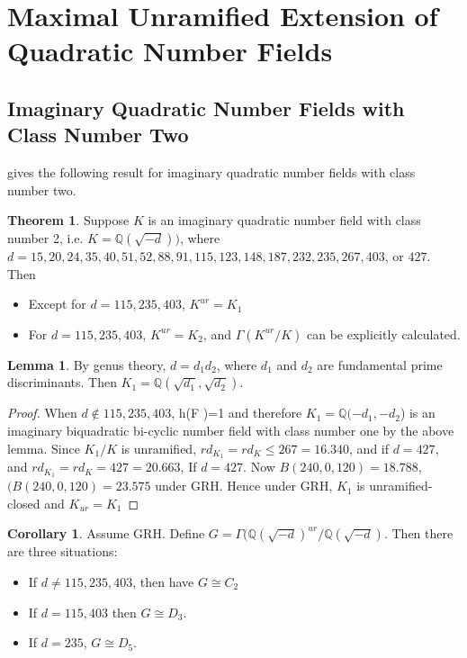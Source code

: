 \documentclass[12pt]{extarticle}
\newcommand{\Q}{\mathbb{Q}}
\newcommand{\<}{\langle}
\renewcommand{\>}{\rangle}
\theoremstyle{definition}
\newtheorem{theorem}{Theorem}
\newtheorem{corollary}{Corollary}
\newtheorem{lemma}{Lemma}
\begin{document}
\section{Maximal Unramified Extension of Quadratic Number Fields}
\subsection{Imaginary Quadratic Number Fields with Class Number Two}
\cite{YAMAMURA1996} gives the following result for imaginary quadratic number fields with class number two.
\begin{theorem}
Suppose $K$ is an imaginary quadratic number field with class number 2, i.e. $K=\Q(\sqrt{-d}))$, where $d= 15, 20, 24, 35, 40, 51, 52, 88, 91, 115, 123, 148, 187, 232, 235, 267, 403$, or $427$. Then \begin{itemize}
\item Except for $d = 115, 235, 403$, $K^{ur} = K_1$
\item For $d = 115, 235, 403$,  $K^{ur} = K_2$, and $\Gamma(K^{ur}/K)$ can be explicitly calculated. 
\end{itemize}
\end{theorem}
\begin{lemma}
By genus theory, $d= d_1d_2$, where $d_1$ and $d_2$ are fundamental prime discriminants. Then $K_1 = \Q(\sqrt{d_1},\sqrt{d_2})$. 
\end{lemma}
\begin{proof}
When $d \not \in {115, 235, 403}$, h(F )=1 and therefore 
$K_1 =\Q(- d_1, - d_2 $) is an imaginary biquadratic bi-cyclic number field with class number one by the above lemma. Since $K_1/K$ is unramified,  $rd_{K_1}=rd_K \leq 267=16.340$, and  if $d = 427$, and $rd_{K_1}=rd_K = 427=20.663$, If $d=427$. Now  $B(240, 0, 120) = 18.788$, $(B(240, 0, 120) = 23.575$ under GRH. Hence under GRH, $K_1$ is unramified-closed and $K_{ur}=K_1$ 
\end{proof}
\begin{corollary}
Assume GRH. Define $G = \Gamma(\Q(\sqrt{-d})^{ur}/\Q(\sqrt{-d})$. Then there are three situations:
\begin{itemize}
\item If $d \neq 115, 235, 403$, then have $ G \cong C_2$
\item If $d = 115,403$ then $G \cong D_3$.
\item If $d =  235$, $G \cong D_5$. 
\end{itemize}
\end{corollary}
\end{document}
